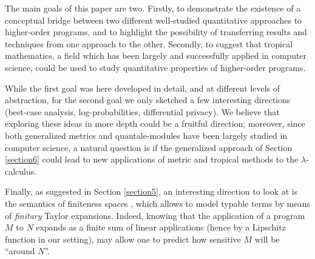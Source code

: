


The main goals of this paper are two. Firstly,  to
demonstrate the existence of a conceptual bridge between two different well-studied quantitative approaches to higher-order programs, and to highlight the possibility of transferring results and techniques from one approach to the other. 
Secondly, to suggest that tropical mathematics, a
field which has been largely and successfully applied in computer science, could be used to study quantitative properties of higher-order programs.

While the first goal was here developed in detail, and at different levels of abstraction, for the second goal we only sketched a few interesting directions (best-case analysis, log-probabilities, differential privacy). We believe that exploring these ideas in more depth could be a fruitful direction; moreover, 
since both generalized metrics and quantale-modules have been largely studied in computer science, 
a natural question is if the generalized approach of Section \ref{section6} could  lead to new applications of metric and tropical methods to the $\lambda$-calculus.

Finally, as suggested in Section \ref{section5}, an interesting direction to look at is the semantics of finiteness spaces \cite{Ehrhard2005}, which allows to model typable terms by means of \emph{finitary} Taylor expansions. Indeed, knowing that the application of a program $M$ to $N$ expands as a finite sum of linear applications (hence by a Lipschitz function in our setting), may allow one to predict how sensitive $M$ will be ``around $N$''.
%
%
%
%
%
%
%
%
%
%
